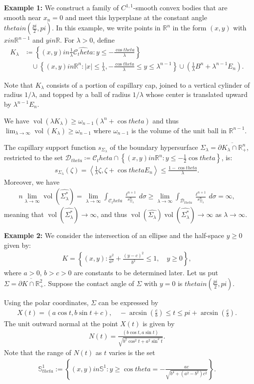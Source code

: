 \documentclass[12pt]{amsart}
\def\theta{theta}%
\def\pi{pi}%
\def\in{in }%
\numberwithin{equation}{section}
\newcommand{\wh}{\widehat}
\newcommand{\bbR}{\mathbb{R}}
\newcommand{\bbS}{\mathbb{S}}
\newcommand{\8}{\infty}
\newcommand{\la}{\lambda}
\newcommand{\si}{\sigma}
\newcommand{\Si}{\Sigma}
\newcommand{\ze}{\zeta}
\newcommand{\cC}{\mathcal{C}}
\newcommand{\cD}{\mathcal{D}}
\newcommand{\ip}[2]{\left\langle #1,#2 \right\rangle}
\DeclareMathOperator{\vol}{vol}
\renewcommand{\(}{\left(}
\renewcommand{\)}{\right)}
\newcommand{\eq}[1]{\begin{equation}\begin{alignedat}{2} #1 \end{alignedat}\end{equation}}
\newcommand{\q}{\quad}
\begin{document}
\textbf{Example 1:} We construct a family of $C^{1,1}$-smooth convex bodies that are smooth near $x_{n} = 0$ and meet this hyperplane at the constant angle $\theta \in (\frac{\pi}{2}, \pi)$.  In this example, we write points in $\bbR^n$ in the form
$(x,y)$ with $x\in\bbR^{n-1}$ and $y\in\bbR$. For $\la > 0$, define
\[
\begin{aligned}
K_{\la} &\coloneqq \left\{ (x, y) \in \frac{1}{\la} \wh{\cC_\theta} : y \leq -\frac{\cos \theta}{\la} \right\} \\
&\q \cup \left\{ (x, y) \in \bbR^n : |x| \leq \frac{1}{\la}, -\frac{\cos \theta}{\la} \leq y \leq \la^{n-1} \right\} \cup \left( \frac{1}{\la} B^n + \la^{n-1} E_n \right).
\end{aligned}
\]

Note that $K_{\lambda}$ consists of a portion of capillary cap, joined to a vertical cylinder of radius $1/\lambda$, and topped by a ball of radius $1/\lambda$ whose center is translated upward by $\lambda^{n-1} E_n$. 

We have $\vol(\la K_{\la}) \geq \omega_{n-1} (\la^n + \cos \theta)$ and thus $\lim_{\la \to \8} \vol(K_{\la}) \geq \omega_{n-1}$ where $\omega_{n-1}$ is the volume of the unit ball in $\mathbb{R}^{n-1}$. 

The capillary support function $s_{\Si_\la}$ of the boundary hypersurface $\Si_\la=\overline{\partial K_{\la}\cap \bbR^n_+}$, restricted to the set $\cD_{\theta} \coloneqq \cC_\theta \cap \left\{ (x, y) \in \bbR^n : y \leq -\frac{1}{2}\cos \theta \right\}$, is:
\eq{
s_{\Si_\la}(\ze) = \ip{\frac{1}{\la} \ze}{\ze + \cos \theta E_n} \leq \frac{1 - \cos \theta}{\la}.
}
Moreover, we have
\eq{
n\lim_{\la \to \8} \vol(\wh{\Si_\la^*}) = \lim_{\la \to \8} \int_{\cC_\theta} \frac{\ell^{n+1}}{s_{\Si_\la}^n} \, d\si\geq \lim_{\la \to \8} \int_{\cD_{\theta}} \frac{\ell^{n+1}}{s_{\Si_\la}^n} \, d\si = \8,
}
meaning that $\vol(\wh{\Si_\la^*}) \to \8$, and thus $\vol(\wh{\Si_\la})\vol(\wh{\Si_\la^*}) \to \8$ as $\la \to \8$. 

\textbf{Example 2:} We consider the intersection of an ellipse and the half-space $y\geq 0$ given by:
\eq{
K= \left\{(x,y): \frac{x^2}{a^2} + \frac{(y - c)^2}{b^2} \leq 1, \q y \geq 0\right\},
}
where $a > 0$, $b > c > 0$ are constants to be determined later. Let us put $\Si=\overline{\partial K\cap \bbR^2_+}$. Suppose the contact angle of $\Si$ with $y=0$ is $\theta\in (\frac{\pi}{2},\pi)$. 

Using the polar coordinates, $\Si$ can be expressed by
\eq{
X(t)=(a\cos t, b\sin t+c),\quad  -\arcsin(\frac{c}{b})\leq t \leq \pi+\arcsin(\frac{c}{b}).
}
The unit outward normal at the point  $X(t)$ is given by
\eq{
N(t)=\frac{(b\cos t,a\sin t)}{\sqrt{b^2\cos^2 t+a^2\sin^2 t}}.
}
Note that the range of $N(t)$ as $t$ varies is the set
\eq{
\bbS_{\theta}^1:=\left\{(x,y)\in \bbS^1: y\geq \cos\theta=-\frac{ac}{\sqrt{b^4+(a^2-b^2)c^2}}\right\}.
}
\end{document}
